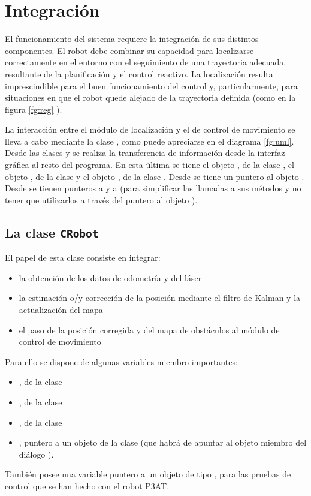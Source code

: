 
\chapter{Integración}\label{ch:integracion}

El funcionamiento del sistema requiere la integración de sus distintos componentes. El robot debe combinar su capacidad para localizarse correctamente en el entorno con el seguimiento de una trayectoria adecuada, resultante de la planificación y el control reactivo. La localización resulta imprescindible para el buen funcionamiento del control y, particularmente, para situaciones en que el robot quede alejado de la trayectoria definida (como en la figura \ref{fg:reg}%
).

La interacción entre el módulo de localización y el de control de movimiento se lleva a cabo mediante la clase , como puede apreciarse en el diagrama \ref{fg:uml}.%
Desde las clases  y  se realiza la transferencia de información desde la interfaz gráfica al resto del programa. En esta última se tiene el objeto , de la clase , el objeto , de la clase  y el objeto , de la clase . Desde  se tiene un puntero al objeto . Desde  se tienen punteros a   y a  (para simplificar las llamadas a sus métodos y no tener que utilizarlos a través del puntero al objeto ).

\section{La clase \texttt{CRobot}}
El papel de esta clase consiste en integrar:
\begin{itemize}
  \item la obtención de los datos de odometría y del láser
  \item la estimación o/y corrección de la posición mediante el filtro de Kalman y la actualización del mapa
  \item el paso de la posición corregida y del mapa de obstáculos al módulo de control de movimiento
\end{itemize}
Para ello se dispone de algunas variables miembro importantes:
\begin{itemize}
  \item {}, de la clase 
  \item {}, de la clase 
  \item {}, de la clase 
  \item {}, puntero a un objeto de la clase  (que habrá de apuntar al objeto  miembro del diálogo ).
\end{itemize}
También posee una variable puntero a un objeto de tipo , para las pruebas de control que se han hecho con el robot P3AT.


